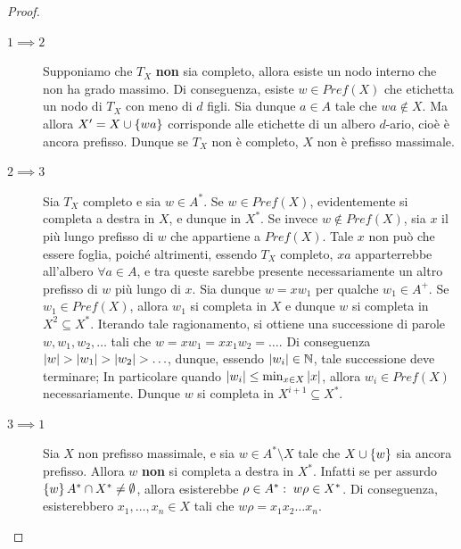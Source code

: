 \begin{proof}
  \begin{description}
    \item[\(1 \implies 2\)]
      Supponiamo che \(T_X\) \textbf{non} sia completo, allora esiste un nodo interno che non ha grado massimo.
      Di conseguenza, esiste \(w \in Pref(X)\) che etichetta un nodo di \(T_X\) con meno di \(d\) figli.
      Sia dunque \(a \in A\) tale che \(wa \not\in X\). Ma allora \(X' = X \cup \set{wa}\) corrisponde alle etichette di un albero \(d\)-ario, cioè è ancora prefisso.
      Dunque se \(T_X\) non è completo, \(X\) non è prefisso massimale.
    \item[\(2 \implies 3\)]
      Sia \(T_X\) completo e sia \(w \in A^*\). Se \(w \in Pref(X)\), evidentemente si completa a destra in \(X\), e dunque in \(X^*\).
      Se invece \(w \not\in Pref(X)\), sia \(x\) il più lungo prefisso di \(w\) che appartiene a \(Pref(X)\).
      Tale \(x\) non può che essere foglia, poiché altrimenti, essendo \(T_X\) completo, \(xa\) apparterrebbe all'albero \(\forall a \in A\), e tra queste sarebbe presente necessariamente un altro prefisso di \(w\) più lungo di \(x\).
      Sia dunque \(w=xw_1\) per qualche \(w_1 \in A^+\). Se \(w_1\in Pref(X)\), allora \(w_1\) si completa in \(X\) e dunque \(w\) si completa in \(X^2\subseteq X^*\).
      Iterando tale ragionamento, si ottiene una successione di parole \(w, w_1, w_2, \ldots\) tali che \(w = x w_1 = x x_1 w_2 = \ldots\).
      Di conseguenza \(\left|w\right| > \left|w_1\right| > \left|w_2\right| > \ldots\), dunque, essendo \(\left|w_i\right| \in \mathbb{N}\), tale successione deve terminare;
      In particolare quando \(\left|w_i\right|\leq \min_{x\in X}\left|x\right|\), allora \(w_i \in Pref(X)\) necessariamente.
      Dunque \(w\) si completa in \(X^{i+1} \subseteq X^*\).
    \item[\(3 \implies 1\)]
      Sia \(X\) non prefisso massimale, e sia \(w \in A^*\setminus X\) tale che \(X \cup \set{w}\) sia ancora prefisso.
      Allora \(w\) \textbf{non} si completa a destra in \(X^*\).
      Infatti se per assurdo \(\set{w}A^* \cap X^* \neq \emptyset\), allora esisterebbe \(\rho \in A^*:\; w\rho \in X^*\).
      Di conseguenza, esisterebbero \(x_1,\ldots,x_n \in X\) tali che \(w\rho = x_1 x_2 \ldots x_n\).
      \begin{figure}[H]
    \centering
\end{figure}
\end{description}
\end{proof}
